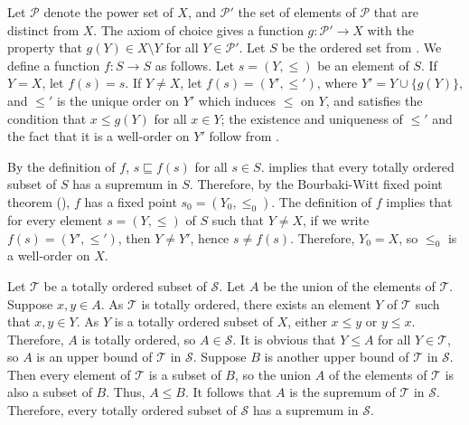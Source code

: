 \documentclass{article}
\begin{document}
\begin{solution}[\ref{exe:fgbbb6v2}]
  \label{sol:v2ix8vst}
  Let \(\mathcal{P}\) denote the power set of \(X\), and
  \(\mathcal{P}'\) the set of elements of \(\mathcal{P}\) that are
  distinct from \(X\).  The axiom of choice gives a function
  \(g : \mathcal{P}' \to X\) with the property that
  \(g(Y) \in X \setminus Y\) for all \(Y \in \mathcal{P}'\).  Let
  \(S\) be the ordered set from .  We define a
  function \(f : S \to S\) as follows.  Let \(s = (Y, \leq)\) be an
  element of \(S\).  If \(Y = X\), let \(f(s) = s\).  If \(Y \neq X\),
  let \(f(s) = (Y', \leq')\), where \(Y' = Y \cup \{ g(Y) \}\), and
  \(\leq'\) is the unique order on \(Y'\) which induces \(\leq\) on
  \(Y\), and satisfies the condition that \(x \leq g(Y)\) for all
  \(x \in Y\); the existence and uniqueness of \(\leq'\) and the fact
  that it is a well-order on \(Y'\) follow from .

  By the definition of \(f\), \(s \sqsubseteq f(s)\) for all
  \(s \in S\).   implies that every totally ordered
  subset of \(S\) has a supremum in \(S\).  Therefore, by the
  Bourbaki-Witt fixed point theorem (), \(f\) has a
  fixed point \(s_0 = (Y_0, \leq_0)\).  The definition of \(f\)
  implies that for every element \(s = (Y, \leq)\) of \(S\) such that
  \(Y \neq X\), if we write \(f(s) = (Y', \leq')\), then
  \(Y \neq Y'\), hence \(s \neq f(s)\).  Therefore, \(Y_0 = X\), so
  \(\leq_0\) is a well-order on \(X\).
\end{solution}

\begin{solution}[\ref{exe:64qxlchj}]
  \label{sol:ejhxq7pq}
  Let \(\mathcal{T}\) be a totally ordered subset of \(\mathcal{S}\).
  Let \(A\) be the union of the elements of \(\mathcal{T}\).  Suppose
  \(x, y \in A\).  As \(\mathcal{T}\) is totally ordered, there exists
  an element \(Y\) of \(\mathcal{T}\) such that \(x, y \in Y\).  As
  \(Y\) is a totally ordered subset of \(X\), either \(x \leq y\) or
  \(y \leq x\).  Therefore, \(A\) is totally ordered, so
  \(A \in \mathcal{S}\).  It is obvious that \(Y \leq A\) for all
  \(Y \in \mathcal{T}\), so \(A\) is an upper bound of \(\mathcal{T}\)
  in \(\mathcal{S}\).  Suppose \(B\) is another upper bound of
  \(\mathcal{T}\) in \(\mathcal{S}\).  Then every element of
  \(\mathcal{T}\) is a subset of \(B\), so the union \(A\) of the
  elements of \(\mathcal{T}\) is also a subset of \(B\).  Thus,
  \(A \leq B\).  It follows that \(A\) is the supremum of
  \(\mathcal{T}\) in \(\mathcal{S}\).  Therefore, every totally
  ordered subset of \(\mathcal{S}\) has a supremum in \(\mathcal{S}\).
\end{solution}
\end{document}
